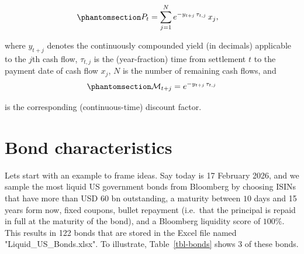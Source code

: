 \documentclass[
  letterpaper,
  DIV=11,
  numbers=noendperiod]{scrreprt}
\begin{document}
\begin{tcolorbox}[enhanced jigsaw, arc=.35mm, bottomrule=.15mm, bottomtitle=1mm, breakable, colback=white, colbacktitle=quarto-callout-note-color!10!white, colframe=quarto-callout-note-color-frame, coltitle=black, left=2mm, leftrule=.75mm, opacityback=0, opacitybacktitle=0.6, rightrule=.15mm, title=\textcolor{quarto-callout-note-color}{\faInfo}\hspace{0.5em}{Note}, titlerule=0mm, toprule=.15mm, toptitle=1mm]

\begin{equation}\protect\phantomsection\label{eq-gen-0029}{  
\begin{align}
P_t &= \sum_{j=1}^{N} e^{-y_{t+j}\,\tau_{t,j}}\,x_j,
\end{align}
}\end{equation}

where \(y_{t+j}\) denotes the continuously compounded yield (in
decimals) applicable to the \(j\)th cash flow, \(\tau_{t,j}\) is the
(year-fraction) time from settlement \(t\) to the payment date of cash
flow \(x_j\), \(N\) is the number of remaining cash flows, and
\begin{equation}\protect\phantomsection\label{eq-gen-0030}{  
\begin{align}
\mathcal{M}_{t+j} = e^{-y_{t+j}\,\tau_{t,j}}
\end{align}
}\end{equation}

is the corresponding (continuous-time) discount factor.

\end{tcolorbox}

\section{Bond characteristics}\label{subsec:bondCharacteristics}

Lets start with an example to frame ideas. Say today is 17 February
2026, and we sample the most liquid US government bonds from Bloomberg
by choosing ISINs that have more than USD 60 bn outstanding, a maturity
between \(10\) days and 15 years form now, fixed coupons, bullet
repayment (i.e.~that the principal is repaid in full at the maturity of
the bond), and a Bloomberg liquidity score of \(100\%\). This results in
122 bonds that are stored in the Excel file named
"Liquid\_US\_Bonds.xlsx". To illustrate, Table~\ref{tbl-bonds} shows 3
of these bonds.
\end{document}
